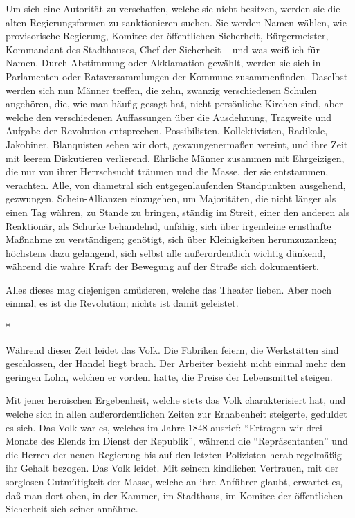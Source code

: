 \documentclass{scrbook}
\begin{document}
Um sich eine Autorität zu verschaffen, welche sie nicht besitzen, werden sie die alten Regierungsformen zu sanktionieren suchen. Sie werden Namen wählen, wie provisorische Regierung, Komitee der öffentlichen Sicherheit, Bürgermeister, Kommandant des Stadthauses, Chef der Sicherheit – und was weiß ich für Namen. Durch Abstimmung oder Akklamation gewählt, werden sie sich in Parlamenten oder Ratsversammlungen der Kommune zusammenfinden. Daselbst werden sich nun Männer treffen, die zehn, zwanzig verschiedenen Schulen angehören, die, wie man häufig gesagt hat, nicht persönliche Kirchen sind, aber welche den verschiedenen Auffassungen über die Ausdehnung, Tragweite und Aufgabe der Revolution entsprechen. Possibilisten, Kollektivisten, Radikale, Jakobiner, Blanquisten sehen wir dort, gezwungenermaßen vereint, und ihre Zeit mit leerem Diskutieren verlierend. Ehrliche Männer zusammen mit Ehrgeizigen, die nur von ihrer Herrschsucht träumen und die Masse, der sie entstammen, verachten. Alle, von diametral sich entgegenlaufenden Standpunkten ausgehend, gezwungen, Schein-Allianzen einzugehen, um Majoritäten, die nicht länger als einen Tag währen, zu Stande zu bringen, ständig im Streit, einer den anderen als Reaktionär, als Schurke behandelnd, unfähig, sich über irgendeine ernsthafte Maßnahme zu verständigen; genötigt, sich über Kleinigkeiten herumzuzanken; höchstens dazu gelangend, sich selbst alle außerordentlich wichtig dünkend, während die wahre Kraft der Bewegung auf der Straße sich dokumentiert.

Alles dieses mag diejenigen amüsieren, welche das Theater lieben. Aber noch einmal, es ist  die Revolution; nichts ist damit geleistet.

\begin{center}*\end{center}

Während dieser Zeit leidet das Volk. Die Fabriken feiern, die Werkstätten sind geschlossen, der Handel liegt brach. Der Arbeiter bezieht nicht einmal mehr den geringen Lohn, welchen er vordem hatte, die Preise der Lebensmittel steigen.

Mit jener heroischen Ergebenheit, welche stets das Volk charakterisiert hat, und welche sich in allen außerordentlichen Zeiten zur Erhabenheit steigerte, geduldet es sich. Das Volk war es, welches im Jahre 1848 ausrief: ``Ertragen wir drei Monate des Elends im Dienst der Republik'', während die ``Repräsentanten'' und die Herren der neuen Regierung bis auf den letzten Polizisten herab regelmäßig ihr Gehalt bezogen. Das Volk leidet. Mit seinem kindlichen Vertrauen, mit der sorglosen Gutmütigkeit der Masse, welche an ihre Anführer glaubt, erwartet es, daß man dort oben, in der Kammer, im Stadthaus, im Komitee der öffentlichen Sicherheit sich seiner annähme.
\end{document}
